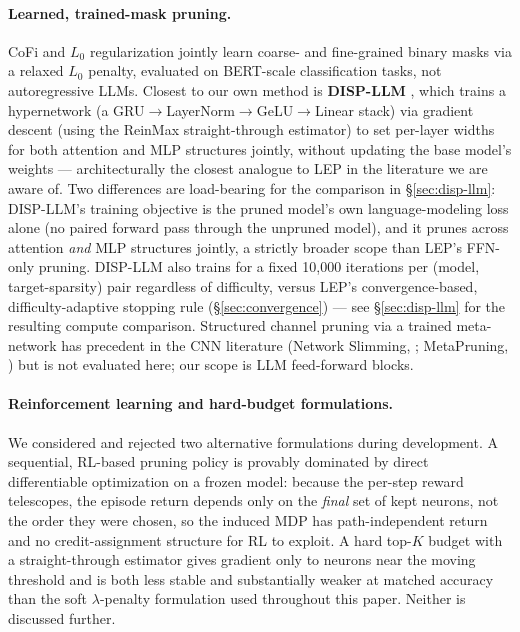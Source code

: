 \documentclass[11pt]{article}
\begin{document}
\paragraph{Learned, trained-mask pruning.} CoFi \citep{xia2022cofi} and $L_0$
regularization \citep{louizos2017l0} jointly learn coarse- and fine-grained
binary masks via a relaxed $L_0$ penalty, evaluated on BERT-scale
classification tasks, not autoregressive LLMs. Closest to our own method is
\textbf{DISP-LLM} \citep{gao2024displlm}, which trains a hypernetwork (a
GRU$\to$LayerNorm$\to$GeLU$\to$Linear stack) via gradient descent (using the
ReinMax straight-through estimator) to set per-layer widths for both
attention and MLP structures jointly, without updating the base model's
weights --- architecturally the closest analogue to LEP in the literature we
are aware of. Two differences are load-bearing for the comparison in \S\ref{sec:disp-llm}:
DISP-LLM's training objective is the pruned model's own language-modeling
loss alone (no paired forward pass through the unpruned model), and it prunes
across attention \emph{and} MLP structures jointly, a strictly broader scope than
LEP's FFN-only pruning. DISP-LLM also trains for a fixed 10,000 iterations
per (model, target-sparsity) pair regardless of difficulty, versus LEP's
convergence-based, difficulty-adaptive stopping rule (\S\ref{sec:convergence}) --- see \S\ref{sec:disp-llm} for
the resulting compute comparison. Structured channel pruning via a trained
meta-network has precedent in the CNN literature (Network Slimming, \citealp{liu2017networkslimming};
MetaPruning, \citealp{liu2019metapruning}) but is not evaluated here; our
scope is LLM feed-forward blocks.

\paragraph{Reinforcement learning and hard-budget formulations.} We considered and
rejected two alternative formulations during development. A sequential,
RL-based pruning policy is provably dominated by direct differentiable
optimization on a frozen model: because the per-step reward telescopes, the
episode return depends only on the \emph{final} set of kept neurons, not the order
they were chosen, so the induced MDP has path-independent return and no
credit-assignment structure for RL to exploit. A hard top-$K$ budget with a
straight-through estimator gives gradient only to neurons near the moving
threshold and is both less stable and substantially weaker at matched
accuracy than the soft $\lambda$-penalty formulation used throughout this
paper. Neither is discussed further.
\end{document}

